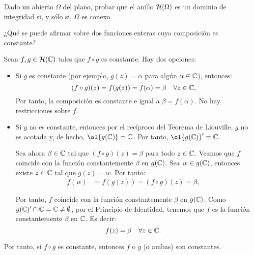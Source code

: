 \begin{ejercicio}
    Dado un abierto $\Omega$ del plano, probar que el anillo $\mathcal{H}(\Omega)$ es un dominio de integridad si, y sólo si, $\Omega$ es conexo.
\end{ejercicio}

\begin{ejercicio}
    ¿Qué se puede afirmar sobre dos funciones enteras cuya composición es constante?

    Sean $f,g\in \mathcal{H}(\mathbb{C})$ tales que $f\circ g$ es constante. Hay dos opciones:
    \begin{itemize}
        \item Si $g$ es constante (por ejemplo, $g(z)=\alpha$ para algún $\alpha\in \mathbb{C}$), entonces:
        \begin{equation*}
            (f\circ g)(z) = f(g(z)) = f(\alpha) = \beta \quad \forall z\in \mathbb{C},
        \end{equation*}
        Por tanto, la composición es constante e igual a $\beta=f(\alpha)$. No hay restricciones sobre $f$.

        \item Si $g$ no es constante, entonces por el recíproco del Teorema de Liouville, $g$ no es acotada y, de hecho, $\ol{g(\bb{C})}=\bb{C}$. Por tanto, $\ol{g(\bb{C})}'=\bb{C}$.
        
        Sea ahora $\beta\in \mathbb{C}$ tal que $(f\circ g)(z)=\beta$ para todo $z\in \mathbb{C}$. Veamos que $f$ coincide con la función constantemente $\beta$ en $g(\mathbb{C})$. Sea $w\in g(\mathbb{C})$, entonces existe $z\in \mathbb{C}$ tal que $g(z)=w$. Por tanto:
        \begin{align*}
            f(w) &= f(g(z)) = (f\circ g)(z) = \beta,
        \end{align*}

        Por tanto, $f$ coincide con la función constantemente $\beta$ en $g(\mathbb{C})$. Como $g(\mathbb{C})'\cap \mathbb{C}=\mathbb{C}\neq \emptyset$, por el Principio de Identidad, tenemos que $f$ es la función constantemente $\beta$ en $\mathbb{C}$. Es decir:
        \begin{equation*}
            f(z)=\beta \quad \forall z\in \mathbb{C}.
        \end{equation*}
    \end{itemize}

    Por tanto, si $f\circ g$ es constante, entonces $f$ o $g$ (o ambas) son constantes.
\end{ejercicio}

